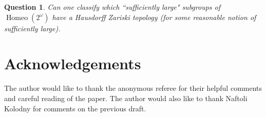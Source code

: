 \documentclass[11pt]{amsart}
\newtheorem{question}[theorem]{Question}
\begin{document}
\begin{question}
    Can one classify which ``sufficiently large" subgroups of \(\operatorname{Homeo}(2^\omega)\) have a Hausdorff Zariski topology (for some reasonable notion of sufficiently large).
\end{question}

\section*{Acknowledgements}
 The author would like to thank the anonymous referee for their helpful comments and
careful reading of the paper. The author would also like to thank Naftoli Kolodny for comments on the previous draft.


\end{document}
